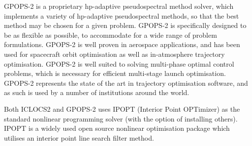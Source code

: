 GPOPS-2 is a proprietary \textsf{hp}-adaptive pseudospectral method solver, which implements a variety of \textsf{hp}-adaptive pseudospectral methods, so that the best method may be chosen for a given problem\cite{Rao2010}. GPOPS-2 is specifically designed to be as flexible as possible, to accommodate for a wide range of problem formulations\cite{Rao2010}. GPOPS-2 is well proven in aerospace applications, and has been used for spacecraft orbit optimisation as well as in-atmosphere trajectory optimisation\cite{Rizvi2015,Lipp2014}. GPOPS-2 is well suited to solving multi-phase optimal control problems, which is necessary for efficient multi-stage launch optimisation\cite{Rao2010}. GPOPS-2 represents the state of the art in trajectory optimisation software, and as such is used by a number of institutions around the world. 

Both ICLOCS2 and GPOPS-2 uses IPOPT\cite{Wachter2006} (Interior Point OPTimizer) as the standard nonlinear programming solver (with the option of installing others). IPOPT is a widely used open source nonlinear optimisation package which utilises an interior point line search filter method. 

